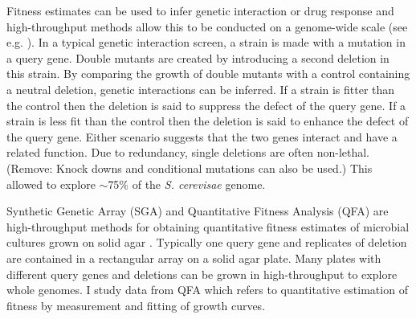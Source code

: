 Fitness estimates can be used to infer genetic interaction or drug
response and high-throughput methods allow this to be conducted on a
genome-wide scale (see e.g. \citet{Costanzo2010,Andrew2013}). In a
typical genetic interaction screen, a strain is made with a mutation
in a query gene. Double mutants are created by introducing a second
deletion in this strain. By comparing the growth of double mutants
with a control containing a neutral deletion, genetic interactions can
be inferred. If a strain is fitter than the control then the deletion
is said to suppress the defect of the query gene. If a strain is less
fit than the control then the deletion is said to enhance the defect
of the query gene. Either scenario suggests that the two genes
interact and have a related function. Due to redundancy, single
deletions are often non-lethal. (Remove: Knock downs and conditional
mutations can also be used.) This allowed \citet{Costanzo2010} to
explore \(\sim\)75\% of the \textit{S. cerevisae} genome.


Synthetic Genetic Array (SGA) and Quantitative Fitness Analysis (QFA)
are high-throughput methods for obtaining quantitative fitness
estimates of microbial cultures grown on solid agar
\citep{Baryshnikova2010sga,Banks2012}. Typically one query gene and
replicates of deletion are contained in a rectangular array on a solid
agar plate. Many plates with different query genes and deletions can
be grown in high-throughput to explore whole genomes. I study data
from QFA which refers to quantitative estimation of fitness by
measurement and fitting of growth curves.


